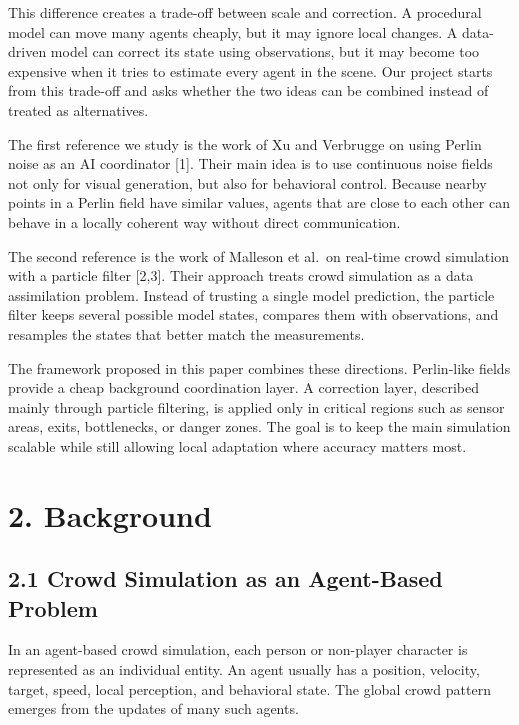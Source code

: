 \documentclass[
  11pt,
]{article}
\begin{document}
This difference creates a trade-off between scale and correction. A
procedural model can move many agents cheaply, but it may ignore local
changes. A data-driven model can correct its state using observations,
but it may become too expensive when it tries to estimate every agent in
the scene. Our project starts from this trade-off and asks whether the
two ideas can be combined instead of treated as alternatives.

The first reference we study is the work of Xu and Verbrugge on using
Perlin noise as an AI coordinator {[}1{]}. Their main idea is to use
continuous noise fields not only for visual generation, but also for
behavioral control. Because nearby points in a Perlin field have similar
values, agents that are close to each other can behave in a locally
coherent way without direct communication.

The second reference is the work of Malleson et al.~on real-time crowd
simulation with a particle filter {[}2,3{]}. Their approach treats crowd
simulation as a data assimilation problem. Instead of trusting a single
model prediction, the particle filter keeps several possible model
states, compares them with observations, and resamples the states that
better match the measurements.

The framework proposed in this paper combines these directions.
Perlin-like fields provide a cheap background coordination layer. A
correction layer, described mainly through particle filtering, is
applied only in critical regions such as sensor areas, exits,
bottlenecks, or danger zones. The goal is to keep the main simulation
scalable while still allowing local adaptation where accuracy matters
most.

\section{2. Background}\label{background}

\subsection{2.1 Crowd Simulation as an Agent-Based
Problem}\label{crowd-simulation-as-an-agent-based-problem}

In an agent-based crowd simulation, each person or non-player character
is represented as an individual entity. An agent usually has a position,
velocity, target, speed, local perception, and behavioral state. The
global crowd pattern emerges from the updates of many such agents.
\end{document}
